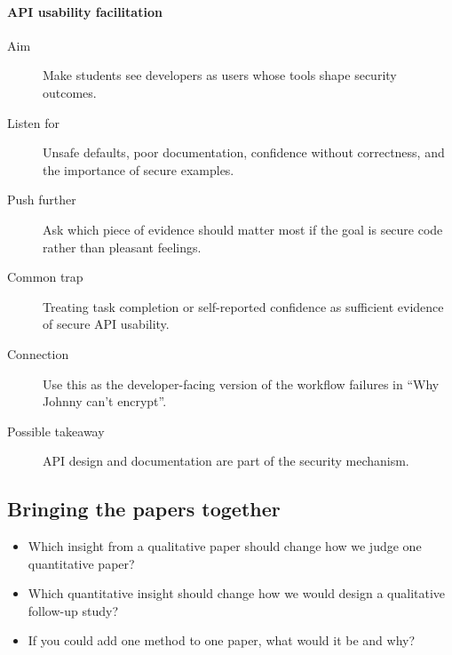 \paragraph{API usability facilitation}
\begin{description}
  \item[Aim] Make students see developers as users whose tools shape security
    outcomes.
  \item[Listen for] Unsafe defaults, poor documentation, confidence without
    correctness, and the importance of secure examples.
  \item[Push further] Ask which piece of evidence should matter most if the goal
    is secure code rather than pleasant feelings.
  \item[Common trap] Treating task completion or self-reported confidence as
    sufficient evidence of secure API usability.
  \item[Connection] Use this as the developer-facing version of the workflow
    failures in \enquote{Why Johnny can't encrypt}.
  \item[Possible takeaway] API design and documentation are part of the
    security mechanism.
\end{description}

\subsection{Bringing the papers together}

\begin{frame}
  \begin{question}
    \begin{itemize}
      \item Which insight from a qualitative paper should change how we judge
        one quantitative paper?
      \item Which quantitative insight should change how we would design a
        qualitative follow-up study?
      \item If you could add one method to one paper, what would it be and why?
    \end{itemize}
  \end{question}
\end{frame}

